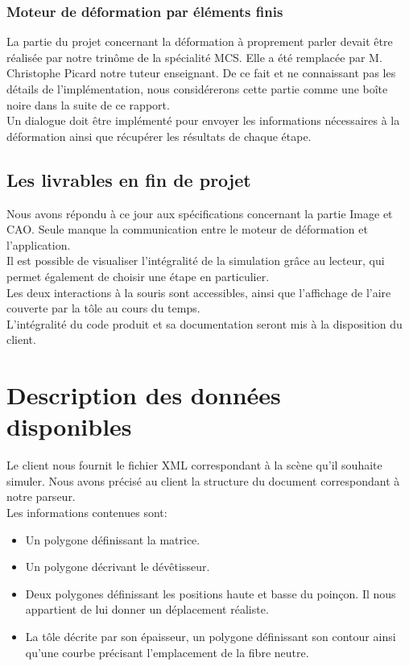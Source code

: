 \documentclass[a4paper, 11pt]{article}
\begin{document}
\subsubsection{Moteur de déformation par éléments finis}
La partie du projet concernant la déformation à proprement parler devait être réalisée par notre trinôme de la spécialité MCS.
Elle a été remplacée par M.
Christophe Picard notre tuteur enseignant.
De ce fait et ne connaissant pas les détails de l'implémentation, nous considérerons cette partie comme une boîte noire dans la suite de ce rapport.\\
Un dialogue doit être implémenté pour envoyer les informations nécessaires à la déformation ainsi que récupérer les résultats de chaque étape.

\subsection{Les livrables en fin de projet}
Nous avons répondu à ce jour aux spécifications concernant la partie Image et CAO.
Seule manque la communication entre le moteur de déformation et l'application.\\
Il est possible de visualiser l'intégralité de la simulation grâce au lecteur, qui permet également de choisir une étape en particulier.\\
Les deux interactions à la souris sont accessibles, ainsi que l'affichage de l'aire couverte par la tôle au cours du temps.\\
L'intégralité du code produit et sa documentation seront mis à la disposition du client.

\section{Description des données disponibles}
Le client nous fournit le fichier XML correspondant à la scène qu'il souhaite simuler.
Nous avons précisé au client la structure du document correspondant à notre parseur.\\
Les informations contenues sont:
\begin{itemize}
        \renewcommand{\labelitemi}{$\bullet$}
    \item Un polygone définissant la matrice.
    \item Un polygone décrivant le dévêtisseur.
    \item Deux polygones définissant les positions haute et basse du poinçon.
        Il nous appartient de lui donner un déplacement réaliste.
    \item La tôle décrite par son épaisseur, un polygone définissant son contour ainsi qu'une courbe précisant l'emplacement de la fibre neutre.
\end{itemize}
\end{document}
